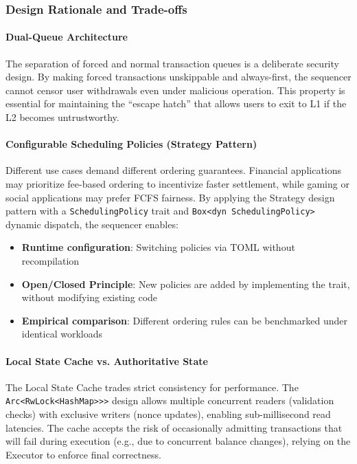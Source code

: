 \subsubsection{Design Rationale and Trade-offs}

\paragraph{Dual-Queue Architecture}

The separation of forced and normal transaction queues is a deliberate security design. By making forced transactions unskippable and always-first, the sequencer cannot censor user withdrawals even under malicious operation. This property is essential for maintaining the ``escape hatch'' that allows users to exit to L1 if the L2 becomes untrustworthy.

\paragraph{Configurable Scheduling Policies (Strategy Pattern)}

Different use cases demand different ordering guarantees. Financial applications may prioritize fee-based ordering to incentivize faster settlement, while gaming or social applications may prefer FCFS fairness. By applying the Strategy design pattern with a \texttt{SchedulingPolicy} trait and \texttt{Box<dyn SchedulingPolicy>} dynamic dispatch, the sequencer enables:

\begin{itemize}
    \item \textbf{Runtime configuration}: Switching policies via TOML without recompilation
    \item \textbf{Open/Closed Principle}: New policies are added by implementing the trait, without modifying existing code
    \item \textbf{Empirical comparison}: Different ordering rules can be benchmarked under identical workloads
\end{itemize}

\paragraph{Local State Cache vs. Authoritative State}

The Local State Cache trades strict consistency for performance. The \texttt{Arc<RwLock<HashMap>{>}{>}} design allows multiple concurrent readers (validation checks) with exclusive writers (nonce updates), enabling sub-millisecond read latencies. The cache accepts the risk of occasionally admitting transactions that will fail during execution (e.g., due to concurrent balance changes), relying on the Executor to enforce final correctness.


